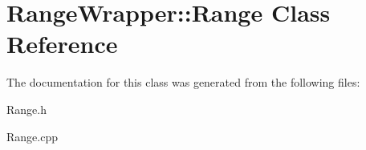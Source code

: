 \hypertarget{class_range_wrapper_1_1_range}{}\section{Range\+Wrapper\+:\+:Range Class Reference}
\label{class_range_wrapper_1_1_range}


The documentation for this class was generated from the following files\+:\begin{DoxyCompactItemize}
\item 
Range.\+h\item 
Range.\+cpp\end{DoxyCompactItemize}
